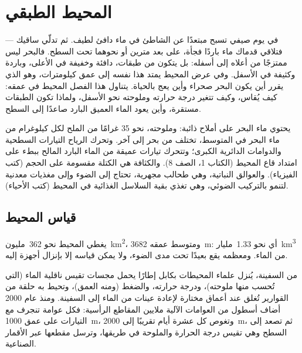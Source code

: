 \chapter{المحيط الطبقي}\label{ch:g10:layered-ocean}

في يوم صيفي تسبح مبتعدًا عن الشاطئ في ماء دافئ لطيف. ثم تدلّي ساقيك --- فتلاقي
قدماك ماء باردًا فجأة، على بعد مترين أو نحوهما تحت السطح. فالبحر ليس ممتزجًا من
أعلاه إلى أسفله: بل يتكون من طبقات، دافئة وخفيفة في الأعلى، وباردة وكثيفة في
الأسفل. وفي عرض المحيط يمتد هذا  نفسه إلى عمق كيلومترات، وهو الذي يقرر أين
يكون البحر صحراء وأين يعج بالحياة. يتناول هذا الفصل المحيط في عمقه: كيف يُقاس،
وكيف تتغير درجة حرارته وملوحته نحو الأسفل، ولماذا تكون الطبقات مستقرة، وأين يعود
الماء العميق البارد صاعدًا إلى السطح.

\begin{recall}
يحتوي ماء البحر على أملاح ذائبة: وملوحته، نحو 35 غرامًا من الملح لكل كيلوغرام من
ماء البحر في المتوسط، تختلف من بحر إلى آخر. وتحرك الرياح التيارات السطحية والدوامات
الدائرية الكبرى؛ وتتحرك تيارات عميقة من الماء البارد المالح ببطء على امتداد قاع
المحيط (الكتاب 1، الصف 8). والكثافة هي الكتلة مقسومة على الحجم (كتب الفيزياء).
والعوالق النباتية، وهي طحالب مجهرية، تحتاج إلى الضوء وإلى مغذيات معدنية لتنمو
بالتركيب الضوئي، وهي تغذي بقية السلاسل الغذائية في المحيط (كتب الأحياء).
\end{recall}

\section{قياس المحيط}

يغطي المحيط نحو \num{362}~مليون~\unit{km^2}، ومتوسط عمقه
\qty{3682}{m}: أي نحو \num{1.33}~مليار~\unit{km^3} من الماء. ومعظمه يقع بعيدًا تحت
مدى الضوء، ولا يمكن قياسه إلا بإنزال أجهزة إليه.

من السفينة، يُنزل علماء المحيطات بكابل إطارًا يحمل مجسات تقيس ناقلية الماء (التي
تُحسب منها ملوحته)، ودرجة حرارته، والضغط (ومنه العمق)، وتحيط به حلقة من القوارير
تُغلق عند أعماق مختارة لإعادة عينات من الماء إلى السفينة. ومنذ عام 2000 أضاف أسطول
من العوامات الآلية ملايين المقاطع الرأسية: فكل عوامة تنجرف مع التيارات على عمق
\qty{1000}{m}، وتغوص كل عشرة أيام تقريبًا إلى \qty{2000}{m}، ثم تصعد إلى السطح
وهي تقيس درجة الحرارة والملوحة في طريقها، وترسل مقطعها عبر
الأقمار الصناعية.

